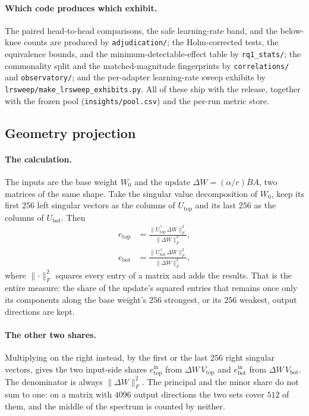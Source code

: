 \documentclass[11pt]{article}
\begin{document}
\paragraph{Which code produces which exhibit.} The paired head-to-head
comparisons, the safe learning-rate band, and the below-knee counts are
produced by \texttt{adjudication/}; the Holm-corrected tests, the equivalence
bounds, and the minimum-detectable-effect table by \texttt{rq1\_stats/}; the
commonality split and the matched-magnitude fingerprints by
\texttt{correlations/} and \texttt{observatory/}; and the per-adapter
learning-rate sweep exhibits by
\texttt{lrsweep/make\_lrsweep\_exhibits.py}. All of these ship
with the release, together with the frozen pool
(\texttt{insights/pool.csv}) and the per-run metric store.

\subsection{Geometry projection}\label{app:geoproj}

\paragraph{The calculation.} The inputs are the base weight $W_0$ and the
update $\Delta W = (\alpha/r)BA$, two matrices of the same shape. Take the
singular value decomposition of $W_0$, keep its first $256$ left singular
vectors as the columns of $U_{\mathrm{top}}$ and its last $256$ as the columns
of $U_{\mathrm{bot}}$. Then
\begin{align*}
  e_{\mathrm{top}} &= \frac{\lVert U_{\mathrm{top}}^{\!\top}\, \Delta W
  \rVert_F^2}{\lVert \Delta W \rVert_F^2}, \\[2pt]
  e_{\mathrm{bot}} &= \frac{\lVert U_{\mathrm{bot}}^{\!\top}\, \Delta W
  \rVert_F^2}{\lVert \Delta W \rVert_F^2},
\end{align*}
where $\lVert\cdot\rVert_F^2$ squares every entry of a matrix and adds the
results. That is the entire measure: the share of the update's squared entries
that remains once only its components along the base weight's $256$ strongest,
or its $256$ weakest, output directions are kept.

\paragraph{The other two shares.} Multiplying on the right instead, by the
first or the last $256$ right
singular vectors, gives the two input-side shares
$e^{\mathrm{in}}_{\mathrm{top}}$ from $\Delta W\,V_{\mathrm{top}}$ and
$e^{\mathrm{in}}_{\mathrm{bot}}$ from $\Delta W\,V_{\mathrm{bot}}$. The
denominator is always $\lVert\Delta W\rVert_F^2$. The principal and the minor
share do not sum to one: on a matrix with $4096$ output directions the two
sets cover $512$ of them, and the middle of the spectrum is counted by
neither.
\end{document}
